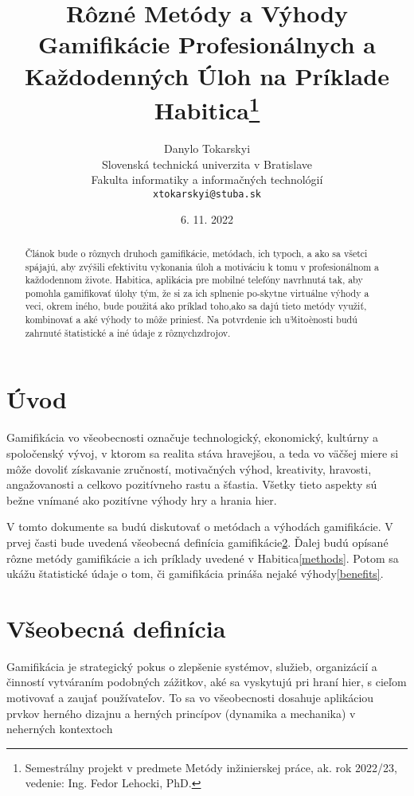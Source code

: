 \documentclass[10pt,twoside,slovak,a4paper]{article}
\title{Rôzné Metódy a Výhody Gamifikácie Profesionálnych a Každodenných Úloh na Príklade Habitica\thanks{Semestrálny 
projekt v predmete Metódy inžinierskej práce, ak. rok 2022/23, vedenie: Ing. Fedor Lehocki, PhD.}}
\author{Danylo Tokarskyi\\[2pt]
	{\small Slovenská technická univerzita v Bratislave}\\
	{\small Fakulta informatiky a informačných technológií}\\
	{\small \texttt{xtokarskyi@stuba.sk}}
	}
\date{\small 6. 11. 2022 } %
\begin{document}
\maketitle

\begin{abstract}
	Článok bude o rôznych druhoch gamifikácie, metódach, ich typoch, a ako sa všetci spájajú, aby zvýšili efektivitu 
	vykonania úloh a motiváciu k tomu v profesionálnom a každodennom živote. Habitica, aplikácia pre mobilné telefóny 
	navrhnutá tak, aby pomohla gamifikovať úlohy tým, že si za ich splnenie po-skytne virtuálne výhody a veci, okrem 
	iného, bude použitá ako príklad toho,ako sa dajú tieto metódy využiť, kombinovať a aké výhody to môže priniesť.
	Na potvrdenie ich u¾itoènosti budú zahrnuté štatistické a iné údaje z rôznychzdrojov.
\end{abstract}



\section{Úvod}

Gamifikácia vo všeobecnosti označuje technologický, ekonomický, kultúrny a spoločenský vývoj, v 
ktorom sa realita stáva hravejšou, a teda vo väčšej miere si môže dovoliť získavanie zručností, 
motivačných výhod, kreativity, hravosti, angažovanosti a celkovo pozitívneho rastu a šťastia. 
Všetky tieto aspekty sú bežne vnímané ako pozitívne výhody hry a hrania hier.\cite{Gamification}

V tomto dokumente sa budú diskutovať o metódach a výhodách gamifikácie. 
V prvej časti bude 
uvedená všeobecná definícia 
gamifikácie\ref{definition}. Ďalej budú opísané rôzne metódy gamifikácie 
a ich príklady uvedené v Habitica\ref{methods}. 
Potom sa ukážu štatistické údaje o tom, či gamifikácia 
prináša nejaké výhody\ref{benefits}.



\section{Všeobecná definícia} \label{definition}

Gamifikácia je strategický pokus o zlepšenie systémov, služieb, organizácií a činností vytváraním podobných zážitkov, aké sa vyskytujú pri hraní hier, s cieľom motivovať a zaujať používateľov\cite{Gamification}. To sa vo všeobecnosti dosahuje aplikáciou prvkov herného dizajnu a herných princípov (dynamika a mechanika) v neherných kontextoch\cite{Defining}
\end{document}
